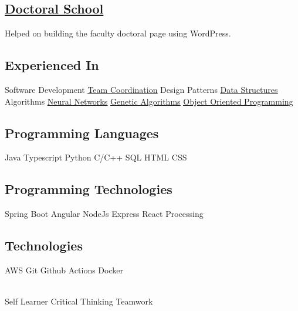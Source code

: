 \documentclass[a4paper]{MagicalCV}
\begin{document}
\begin{minipage}[t]{0.38\textwidth}
\subsection{\href{https://www.info.uaic.ro/scoala-doctorala/}{Doctoral School}}
Helped on building the faculty doctoral page using WordPress.
\sectionsep


\subsection{Experienced In}
Software Development \textbullet{} \href{https://github.com/valentin-stamate/Software-Engineering-Project}{\underline{Team Coordination}}
\textbullet{} Design Patterns \textbullet{} \href{https://github.com/valentin-stamate/Data-Structures}{\underline{Data Structures}}
\textbullet{} Algorithms \textbullet{} \href{https://github.com/valentin-stamate/Neural-Networks-Playground}{\underline{Neural Networks}}
\textbullet{} \href{https://github.com/valentin-stamate/Genetic-Algorithms-Playground}{\underline{Genetic Algorithms}}
\textbullet{} \href{https://github.com/valentin-stamate/OOP-Labs}{\underline{Object Oriented Programming}}
\sectionsep

\subsection{Programming Languages}
Java \textbullet{} Typescript \textbullet{} Python \textbullet{} C/C++ \textbullet{} SQL \textbullet{} HTML  \textbullet{} CSS
\sectionsep

\subsection{Programming Technologies}
Spring Boot \textbullet{} Angular \textbullet{} NodeJs \textbullet{} Express \textbullet{} React \textbullet{} Processing
\sectionsep

\subsection{Technologies}
AWS \textbullet{} Git \textbullet{} Github Actions \textbullet{} Docker
\sectionsep

 \\
Self Learner \textbullet{} Critical Thinking \textbullet{} Teamwork




\end{minipage} 
\end{document}
